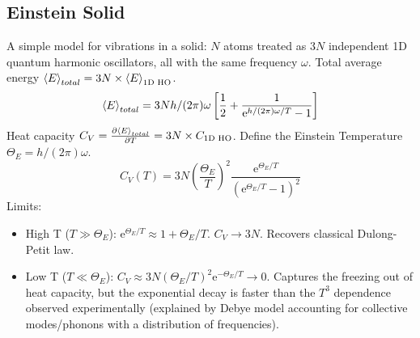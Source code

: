 \documentclass[10pt, letterpaper]{article}
\renewcommand{\hbar}{h/(2\pi)} %
\newcommand{\avg}[1]{\expval{#1}} %
\newcommand{\mathe}{\mathrm{e}} %
\begin{document}
\subsection{Einstein Solid}
A simple model for vibrations in a solid: $N$ atoms treated as $3N$ independent 1D quantum harmonic oscillators, all with the same frequency $\omega$.
Total average energy $\avg{E}_{total} = 3N \times \avg{E}_{\text{1D HO}}$.
\begin{equation*}
    \avg{E}_{total} = 3N \hbar \omega \left[ \frac{1}{2} + \frac{1}{\mathe^{\hbar \omega / T} - 1} \right]
\end{equation*}
Heat capacity $C_V = \pdv{\avg{E}_{total}}{T} = 3N \times C_{\text{1D HO}}$. Define the Einstein Temperature $\Theta_E = \hbar \omega$.
\begin{equation}
    C_V(T) = 3N \left( \frac{\Theta_E}{T} \right)^2 \frac{\mathe^{\Theta_E / T}}{(\mathe^{\Theta_E / T} - 1)^2}
\end{equation}
Limits:
\begin{itemize}
    \item High T ($T \gg \Theta_E$): $\mathe^{\Theta_E / T} \approx 1 + \Theta_E / T$. $C_V \to 3N$. Recovers classical Dulong-Petit law.
    \item Low T ($T \ll \Theta_E$): $C_V \approx 3N (\Theta_E/T)^2 \mathe^{-\Theta_E / T} \to 0$. Captures the freezing out of heat capacity, but the exponential decay is faster than the $T^3$ dependence observed experimentally (explained by Debye model accounting for collective modes/phonons with a distribution of frequencies).
\end{itemize}
\end{document}
